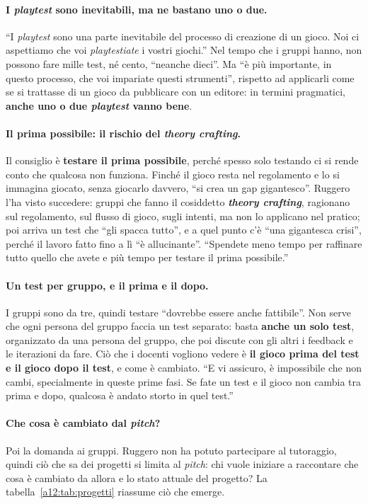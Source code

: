 \paragraph{I \emph{playtest} sono inevitabili, ma ne bastano uno o due.} ``I
\emph{playtest} sono una parte inevitabile del processo di creazione di un gioco. Noi ci
aspettiamo che voi \emph{playtestiate} i vostri giochi.'' Nel tempo che i gruppi hanno,
non possono fare mille test, né cento, ``neanche dieci''. Ma ``è più importante, in
questo processo, che voi impariate questi strumenti'', rispetto ad applicarli come se si
trattasse di un gioco da pubblicare con un editore: in termini pragmatici, \textbf{anche
uno o due \emph{playtest} vanno bene}.

\paragraph{Il prima possibile: il rischio del \emph{theory crafting}.} Il consiglio è
\textbf{testare il prima possibile}, perché spesso solo testando ci si rende conto che
qualcosa non funziona. Finché il gioco resta nel regolamento e lo si immagina giocato,
senza giocarlo davvero, ``si crea un gap gigantesco''. Ruggero l'ha visto succedere: gruppi
che fanno il cosiddetto \textbf{\emph{theory crafting}}, ragionano sul regolamento, sul
flusso di gioco, sugli intenti, ma non lo applicano nel pratico; poi arriva un test che
``gli spacca tutto'', e a quel punto c'è ``una gigantesca crisi'', perché il lavoro fatto
fino a lì ``è allucinante''. ``Spendete meno tempo per raffinare tutto quello che avete e
più tempo per testare il prima possibile.''

\paragraph{Un test per gruppo, e il prima e il dopo.} I gruppi sono da tre, quindi
testare ``dovrebbe essere anche fattibile''. Non serve che ogni persona del gruppo faccia
un test separato: basta \textbf{anche un solo test}, organizzato da una persona del
gruppo, che poi discute con gli altri i feedback e le iterazioni da fare. Ciò che i
docenti vogliono vedere è \textbf{il gioco prima del test e il gioco dopo il test}, e come
è cambiato. ``E vi assicuro, è impossibile che non cambi, specialmente in queste prime
fasi. Se fate un test e il gioco non cambia tra prima e dopo, qualcosa è andato storto in
quel test.''

\paragraph{Che cosa è cambiato dal \emph{pitch}?} Poi la domanda ai gruppi. Ruggero non
ha potuto partecipare al tutoraggio, quindi ciò che sa dei progetti si limita al
\emph{pitch}: chi vuole iniziare a raccontare che cosa è cambiato da allora e lo stato
attuale del progetto? La tabella~\ref{a12:tab:progetti} riassume ciò che emerge.


